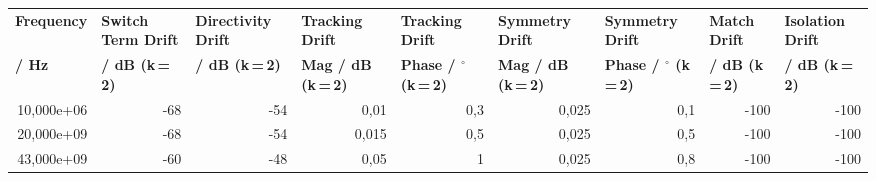 \begin{longtable}{rrrrrrrrr}
\multicolumn{1}{l}{\textbf{Frequency}} & \multicolumn{1}{l}{\textbf{Switch Term Drift}} & \multicolumn{1}{l}{\textbf{Directivity Drift}} & \multicolumn{1}{l}{\textbf{Tracking Drift}} & \multicolumn{1}{l}{\textbf{Tracking Drift}} & \multicolumn{1}{l}{\textbf{Symmetry Drift}} & \multicolumn{1}{l}{\textbf{Symmetry Drift}} & \multicolumn{1}{l}{\textbf{Match Drift}} & \multicolumn{1}{l}{\textbf{Isolation Drift}}\\
\multicolumn{1}{l}{\textbf{/ Hz}} & \multicolumn{1}{l}{\textbf{/ dB (k\,=\,2)}} & \multicolumn{1}{l}{\textbf{/ dB (k\,=\,2)}} & \multicolumn{1}{l}{\textbf{Mag / dB (k\,=\,2)}} & \multicolumn{1}{l}{\textbf{Phase / $\mathbf{^{\circ}}$ (k\,=\,2)}} & \multicolumn{1}{l}{\textbf{Mag / dB (k\,=\,2)}} & \multicolumn{1}{l}{\textbf{Phase / $\mathbf{^{\circ}}$ (k\,=\,2)}} & \multicolumn{1}{l}{\textbf{/ dB (k\,=\,2)}} & \multicolumn{1}{l}{\textbf{/ dB (k\,=\,2)}}\\
\hline
\endhead
10,000e+06 & -68 & -54 & 0,01 & 0,3 & 0,025 & 0,1 & -100 & -100\\
20,000e+09 & -68 & -54 & 0,015 & 0,5 & 0,025 & 0,5 & -100 & -100\\
43,000e+09 & -60 & -48 & 0,05 & 1 & 0,025 & 0,8 & -100 & -100\\
\end{longtable}
